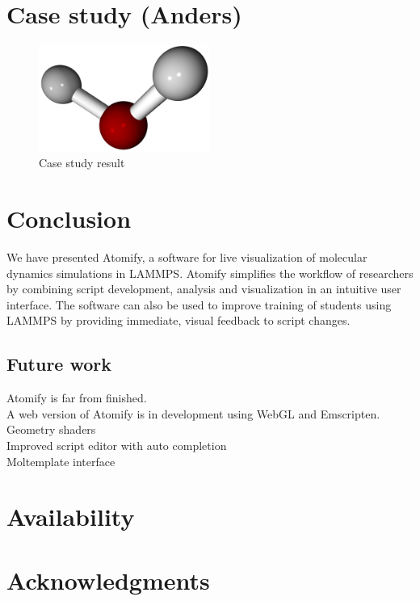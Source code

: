 \documentclass[aps,pre,twocolumn,letterpaper,floatfix,nofootinbib]{revtex4}
\begin{document}

\section{Case study (Anders)}

\begin{figure}
	\centering
	\includegraphics[width=0.5\textwidth]{final_billboard.png}
	\caption{Case study result}
	\label{fig:gui}
\end{figure}

\section{Conclusion}
%
We have presented Atomify, a software for live visualization of molecular
dynamics simulations in LAMMPS.
Atomify simplifies the workflow of researchers by combining script development,
analysis and visualization in an intuitive user interface.
The software can also be used to improve training of students using LAMMPS by
providing immediate, visual feedback to script changes.

\subsection{Future work}
Atomify is far from finished.\\
A web version of Atomify is in development using WebGL and Emscripten. \\
Geometry shaders \\
Improved script editor with auto completion \\
Moltemplate interface \\

\section{Availability}

\section{Acknowledgments}

% 

\end{document}
